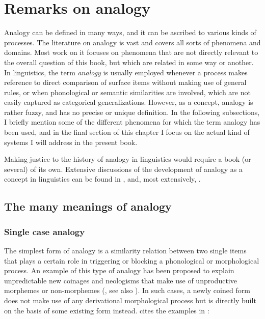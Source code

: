 \chapter{Remarks on analogy}\label{chap:problems}
\largerpage 
Analogy can be defined in many ways, and it can be ascribed to various kinds of processes. The literature on analogy is vast and covers all sorts of phenomena and domains. Most work on it focuses on phenomena that are not directly relevant to the overall question of this book, but which are related in some way or another. In linguistics, the term \textit{analogy} is usually employed whenever a process makes reference to direct comparison of surface items without making use of general rules, or when phonological or semantic similarities are involved, which are not easily captured as categorical generalizations. However, as a concept, analogy is rather fuzzy, and has no precise or unique definition. In the following subsections, I briefly mention some of the different phenomena for which the term analogy has been used, and in the final section of this chapter I focus on the actual kind of systems I will address in the present book.

Making justice to the history of analogy in linguistics would require a book (or several) of its own. Extensive discussions of the development of analogy as a concept in linguistics can be found in  \textcite{Anttila.1977}, \textcite{Rainer.2013} and, most extensively, \textcite{Itkonen.2005}.

\section{The many meanings of analogy}

\subsection{Single case analogy}

The simplest form of analogy is a similarity relation between two single items that plays a certain role in triggering or blocking a phonological or morphological process. An example of this type of analogy has been proposed to explain unpredictable new coinages and neologisms that make use of unproductive morphemes or non-morphemes (\citealt[195]{Motsch.1977}, see also \citealt{Butterworth.1983}). In such cases, a newly coined form does not make use of any derivational morphological process but is directly built on the basis of some existing form instead. \textcite[89]{Booij.2010} cites the examples in :

